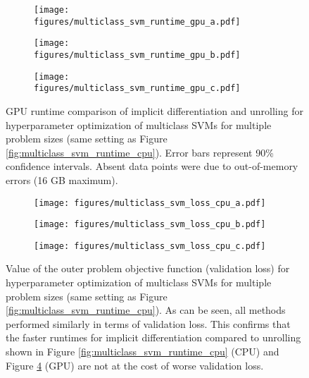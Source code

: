 \documentclass{article}
\begin{document}
\begin{figure}[p]
\begin{subfigure}{.33\textwidth}
  \centering
  \texttt{[image: figures/multiclass\_svm\_runtime\_gpu\_a.pdf]}
  \caption{}
  \label{fig:multiclass_svm_runtime_gpu_a}
\end{subfigure}
\begin{subfigure}{.33\textwidth}
  \centering
  \texttt{[image: figures/multiclass\_svm\_runtime\_gpu\_b.pdf]}
  \caption{}
  \label{fig:multiclass_svm_runtime_gpu_b}
\end{subfigure}
\begin{subfigure}{.33\textwidth}
  \centering
  \texttt{[image: figures/multiclass\_svm\_runtime\_gpu\_c.pdf]}
  \caption{}
  \label{fig:multiclass_svm_runtime_gpu_c}
\end{subfigure}
\caption{GPU runtime comparison of implicit differentiation and unrolling for
    hyperparameter optimization of multiclass SVMs for multiple problem sizes
    (same setting as Figure \ref{fig:multiclass_svm_runtime_cpu}).
    Error bars represent 90\% confidence intervals. Absent data points were due
to out-of-memory errors (16 GB maximum).}
\label{fig:multiclass_svm_runtime_gpu}
\end{figure}

\begin{figure}[p]
\begin{subfigure}{.33\textwidth}
  \centering
  \texttt{[image: figures/multiclass\_svm\_loss\_cpu\_a.pdf]}
  \caption{}
  \label{fig:multiclass_svm_loss_cpu_a}
\end{subfigure}
\begin{subfigure}{.33\textwidth}
  \centering
  \texttt{[image: figures/multiclass\_svm\_loss\_cpu\_b.pdf]}
  \caption{}
  \label{fig:multiclass_svm_loss_cpu_b}
\end{subfigure}
\begin{subfigure}{.33\textwidth}
  \centering
  \texttt{[image: figures/multiclass\_svm\_loss\_cpu\_c.pdf]}
  \caption{}
  \label{fig:multiclass_svm_loss_cpu_c}
\end{subfigure}
\caption{Value of the outer problem objective function (validation loss) for
    hyperparameter optimization of multiclass SVMs for multiple problem sizes
(same setting as Figure \ref{fig:multiclass_svm_runtime_cpu}).
As can be seen, all methods performed similarly in terms of validation loss.
This confirms that the faster runtimes for implicit differentiation compared to
unrolling shown in
Figure \ref{fig:multiclass_svm_runtime_cpu} (CPU) and Figure
\ref{fig:multiclass_svm_runtime_gpu} (GPU) are not at the cost of worse
validation loss.}
\label{fig:multiclass_svm_loss_cpu}
\end{figure}
\end{document}
